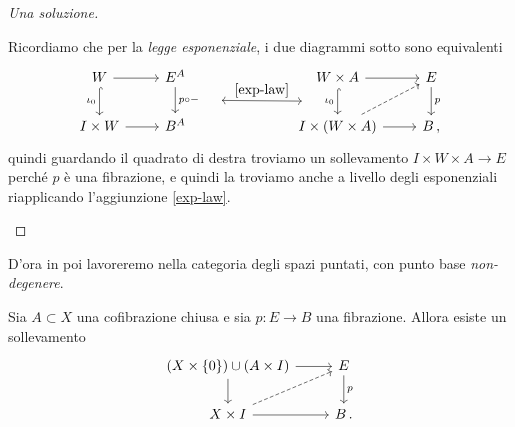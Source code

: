 \begin{exercise}
\begin{proof}[Una soluzione]
\begin{rmnumerate}
			\addtocounter{enumi}{2}
			
			\item Ricordiamo che per la \emph{legge esponenziale}, 
			i due diagrammi sotto sono equivalenti
			\begin{equation*}
				\begin{tikzcd}
					W \ar[r] \ar[d, "\iota_{0}"', hook] & E^{A} \ar[d, "p \circ -"{name=S}] 
					& & & W \times A \ar[r] \ar[d, "\iota_{0}"'{name=E}, hook] & E \ar[d, "p"]\\
					I \times W \ar[r] & B^{A}
					& & & I \times (W \times A) \ar[r] \ar[ur, dashed] & B\,,
					\ar[from=S, to=E, shorten=14pt, "\eqref{exp-law}", leftrightarrow]
				\end{tikzcd}
			\end{equation*}
			quindi guardando il quadrato di destra troviamo un sollevamento 
			$I \times W \times A \to E$ perché
			$p$ è una fibrazione, e quindi la troviamo anche a livello degli esponenziali
			riapplicando l'aggiunzione \eqref{exp-law}.
		\end{rmnumerate}
	\end{proof}
\end{exercise}

D'ora in poi lavoreremo nella categoria
degli spazi puntati, con punto base \emph{non-degenere}.
\begin{lemma}\label{relative-HLP}
	Sia $A \subset X$ una cofibrazione chiusa
	e sia $p:E \to B$ una fibrazione. Allora esiste un sollevamento
	\begin{equation*}
		\begin{tikzcd}
			(X \times \{0\}) \cup (A \times I) \ar[d] \ar[r] & E \ar[d, "p"] \\
			X \times I \ar[r] \ar[ur,dashed] & B\,.
		\end{tikzcd}
	\end{equation*}
\end{lemma}

